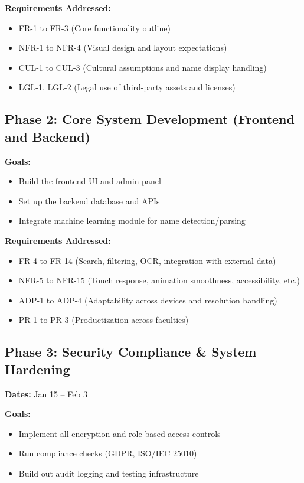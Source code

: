 \documentclass[12pt]{article}
\begin{document}
\textbf{Requirements Addressed:}
\begin{itemize}
  \item FR-1 to FR-3 (Core functionality outline)
  \item NFR-1 to NFR-4 (Visual design and layout expectations)
  \item CUL-1 to CUL-3 (Cultural assumptions and name display handling)
  \item LGL-1, LGL-2 (Legal use of third-party assets and licenses)
\end{itemize}

\subsection*{Phase 2: Core System Development (Frontend and Backend)}
\textbf{Goals:}
\begin{itemize}
  \item Build the frontend UI and admin panel
  \item Set up the backend database and APIs
  \item Integrate machine learning module for name detection/parsing
\end{itemize}

\textbf{Requirements Addressed:}
\begin{itemize}
  \item FR-4 to FR-14 (Search, filtering, OCR, integration with external data)
  \item NFR-5 to NFR-15 (Touch response, animation smoothness, accessibility, etc.)
  \item ADP-1 to ADP-4 (Adaptability across devices and resolution handling)
  \item PR-1 to PR-3 (Productization across faculties)
\end{itemize}

\subsection*{Phase 3: Security Compliance \& System Hardening}
\textbf{Dates:} Jan 15 -- Feb 3

\textbf{Goals:}
\begin{itemize}
  \item Implement all encryption and role-based access controls
  \item Run compliance checks (GDPR, ISO/IEC 25010)
  \item Build out audit logging and testing infrastructure
\end{itemize}
\end{document}
